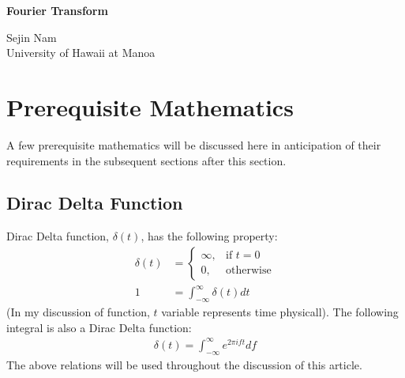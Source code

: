 \documentclass[letterpaper, 11pt]{article}
\newcommand{\fint}{\int_{-\infty}^{\infty}} %
\numberwithin{equation}{section}
\begin{document}

\begin{titlepage}
	\begin{center}
		\Huge{\bfseries Fourier Transform}\vfill 
	\end{center}

	\begin{flushright}
		Sejin Nam\\
		University of Hawaii at Manoa
	\end{flushright}
\end{titlepage}

\begin{comment} %
\title{Fourier Transform}
\author{Sejin Nam}
\date{May 20}
\maketitle
\thispagestyle{empty}
\clearpage
\end{comment}

\tableofcontents
\clearpage

\section{Prerequisite Mathematics}
A few prerequisite mathematics will be discussed here in anticipation of their requirements in the subsequent sections after this section. 

\subsection{Dirac Delta Function}
Dirac Delta function, \(\delta (t)\), has the following property:
\begin{align}
	\delta (t)	&=\begin{cases}
		\infty, & \text{if } t = 0 \\
		0,	& \text{otherwise}
	\end{cases}\\
		1	&= \fint \delta (t) dt
\end{align}
(In my discussion of function, \(t\) variable represents time physicall). The following integral is also a Dirac Delta function:
\begin{align}
	\delta (t) = \fint e^{2\pi ift} df\label{eq:dirac}
\end{align}
The above relations will be used throughout the discussion of this article.
\end{document}
